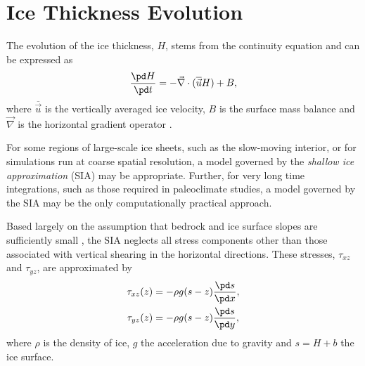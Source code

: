 \section{Ice Thickness Evolution}
\label{sc:glide_thickness_evolution}
The evolution of the ice thickness, $H$, stems from the continuity equation and can be expressed as
\begin{equation}
  \label{kin.eq.ice_thickness}
  \frac{\pd H}{\pd t} = -\vec\nabla\cdot(\overline{\vec{u}} H) + B,
\end{equation}
where $\overline{\vec{u}}$ is the vertically averaged ice velocity, $B$ is the surface mass balance and $\vec\nabla$ is the horizontal gradient operator \citep{Payne1997}. 

For some regions of large-scale ice sheets, such as the slow-moving interior, or for simulations run at coarse spatial resolution, a model governed by the \emph{shallow ice approximation} (SIA) may be appropriate. Further, for very long time integrations, such as those required in paleoclimate studies, a model governed by the SIA may
be the only computationally practical approach.

Based largely on the assumption that bedrock and ice surface slopes are sufficiently small \citep{Hutter1983}, the SIA neglects all stress components other than those associated with vertical shearing in the horizontal directions. 
These stresses, $\tau_{xz}$ and $\tau_{yz}$, are approximated by
\begin{equation}
  \label{kin.eq.horiz_shear}
  \begin{split}
    \tau_{xz}(z)&=-\rho g(s-z)\frac{\pd s}{\pd x},\\
    \tau_{yz}(z)&=-\rho g(s-z)\frac{\pd s}{\pd y},
  \end{split}
\end{equation}
where $\rho$ is the density of ice, $g$ the acceleration due to gravity and $s=H+b$ the ice surface. 


